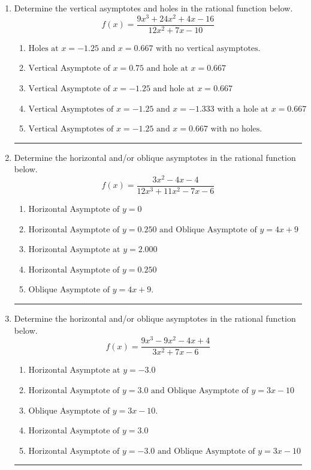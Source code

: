 \documentclass[14pt]{extbook}
\newcommand{\litem}[1]{\item#1\hspace*{-1cm}\rule{\textwidth}{0.4pt}}
\begin{document}
\begin{enumerate}
{\begin{enumerate}[label=\Alph*.]
\end{enumerate} }
\litem{
Determine the vertical asymptotes and holes in the rational function below.\[ f(x) = \frac{9x^{3} +24 x^{2} +4 x -16}{12x^{2} +7 x -10} \]\begin{enumerate}[label=\Alph*.]
\item \( \text{Holes at } x = -1.25 \text{ and } x = 0.667 \text{ with no vertical asymptotes.} \)
\item \( \text{Vertical Asymptote of } x = 0.75 \text{ and hole at } x = 0.667 \)
\item \( \text{Vertical Asymptote of } x = -1.25 \text{ and hole at } x = 0.667 \)
\item \( \text{Vertical Asymptotes of } x = -1.25 \text{ and } x = -1.333 \text{ with a hole at } x = 0.667 \)
\item \( \text{Vertical Asymptotes of } x = -1.25 \text{ and } x = 0.667 \text{ with no holes.} \)

\end{enumerate} }
\litem{
Determine the horizontal and/or oblique asymptotes in the rational function below.\[ f(x) = \frac{3x^{2} -4 x -4}{12x^{3} +11 x^{2} -7 x -6} \]\begin{enumerate}[label=\Alph*.]
\item \( \text{Horizontal Asymptote of } y = 0 \)
\item \( \text{Horizontal Asymptote of } y = 0.250 \text{ and Oblique Asymptote of } y = 4x + 9 \)
\item \( \text{Horizontal Asymptote at } y = 2.000 \)
\item \( \text{Horizontal Asymptote of } y = 0.250  \)
\item \( \text{Oblique Asymptote of } y = 4x + 9. \)

\end{enumerate} }
\litem{
Determine the horizontal and/or oblique asymptotes in the rational function below.\[ f(x) = \frac{9x^{3} -9 x^{2} -4 x + 4}{3x^{2} +7 x -6} \]\begin{enumerate}[label=\Alph*.]
\item \( \text{Horizontal Asymptote at } y = -3.0 \)
\item \( \text{Horizontal Asymptote of } y = 3.0 \text{ and Oblique Asymptote of } y = 3x -10 \)
\item \( \text{Oblique Asymptote of } y = 3x -10. \)
\item \( \text{Horizontal Asymptote of } y = 3.0  \)
\item \( \text{Horizontal Asymptote of } y = -3.0 \text{ and Oblique Asymptote of } y = 3x -10 \)


\end{enumerate}}
\end{enumerate}
\end{document}
